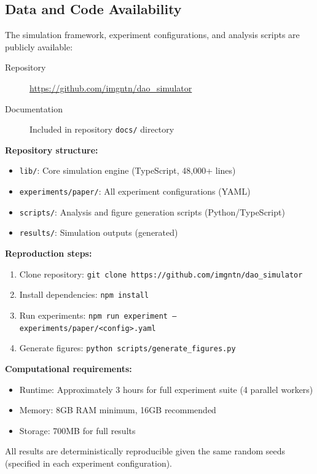 \subsection{Data and Code Availability}

The simulation framework, experiment configurations, and analysis scripts are publicly available:

\begin{description}
    \item[Repository] \url{https://github.com/imgntn/dao_simulator}
    \item[Documentation] Included in repository \texttt{docs/} directory
\end{description}

\textbf{Repository structure:}
\begin{itemize}
    \item \texttt{lib/}: Core simulation engine (TypeScript, 48{,}000+ lines)
    \item \texttt{experiments/paper/}: All experiment configurations (YAML)
    \item \texttt{scripts/}: Analysis and figure generation scripts (Python/TypeScript)
    \item \texttt{results/}: Simulation outputs (generated)
\end{itemize}

\textbf{Reproduction steps:}
\begin{enumerate}
    \item Clone repository: \texttt{git clone https://github.com/imgntn/dao\_simulator}
    \item Install dependencies: \texttt{npm install}
    \item Run experiments: \texttt{npm run experiment -- experiments/paper/<config>.yaml}
    \item Generate figures: \texttt{python scripts/generate\_figures.py}
\end{enumerate}

\textbf{Computational requirements:}
\begin{itemize}
    \item Runtime: Approximately 3 hours for full experiment suite (4 parallel workers)
    \item Memory: 8GB RAM minimum, 16GB recommended
    \item Storage: 700MB for full results
\end{itemize}

All results are deterministically reproducible given the same random seeds (specified in each experiment configuration).

